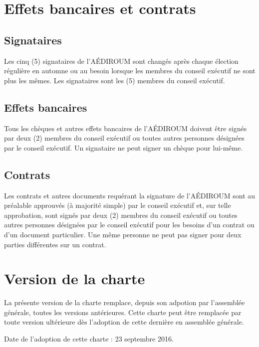 \documentclass[12pt]{article}
\begin{document}
\section{Effets bancaires et contrats}
\subsection{Signataires}
Les cinq (5) signataires de l'AÉDIROUM sont changés après chaque élection régulière en automne ou au besoin lorsque les membres du conseil exécutif ne sont plus les mêmes. Les signataires sont les (5) membres du conseil exécutif.

\subsection{Effets bancaires}

Tous les chèques et autres effets bancaires de l'AÉDIROUM doivent être signés par deux (2) membres du conseil exécutif ou toutes autres personnes désignées par le conseil exécutif. Un signataire ne peut signer un chèque pour lui-même.

\subsection{Contrats}

Les contrats et autres documents requérant la signature de l'AÉDIROUM sont au préalable approuvés (à majorité simple) par le conseil exécutif et, sur telle approbation, sont signés par deux (2) membres du conseil exécutif ou toutes autres personnes désignées par le conseil exécutif pour les besoins d'un contrat ou d'un document particulier. Une même personne ne peut pas signer pour deux parties différentes sur un contrat.

\section{Version de la charte}
La présente version de la charte remplace, depuis son adpotion par l'assemblée générale, toutes les versions antérieures. Cette charte peut être remplacée par toute version ultérieure dès l'adoption de cette dernière en assemblée générale.

Date de l'adoption de cette charte : 23 septembre 2016.
\end{document}
